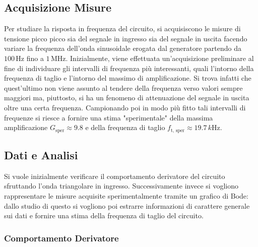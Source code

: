 \documentclass[a4paper,11pt]{article} %
\begin{document}
\subsection{Acquisizione Misure}

Per studiare la risposta in frequenza del circuito, si acquisiscono le misure di tensione picco picco sia del segnale in
ingresso sia del segnale in uscita facendo variare la frequenza dell'onda sinusoidale erogata dal generatore partendo da
$100\,\si{\Hz}$ fino a $1\,\si{\MHz}$. Inizialmente, viene effettuata un'acquisizione preliminare al fine di individuare
gli intervalli di frequenza più interessanti, quali l'intorno della frequenza di taglio e l'intorno del massimo di
amplificazione. Si trova infatti che quest'ultimo non viene assunto al tendere della frequenza verso valori sempre
maggiori ma, piuttosto, si ha un fenomeno di attenuazione del segnale in uscita oltre una certa frequenza. Campionando
poi in modo più fitto tali intervalli di frequenze si riesce a fornire una stima "sperimentale" della massima
amplificazione $G_{\text{sper}}\approx 9.8$ e della frequenza di taglio $f_{\text{t, sper}}\approx 19.7\,\si{k\Hz}$.



\subsection{Dati e Analisi}

Si vuole inizialmente verificare il comportamento derivatore del circuito sfruttando l'onda triangolare in ingresso.
Successivamente invece si vogliono rappresentare le misure acquisite sperimentalmente tramite un grafico di Bode: dallo
studio di questo si vogliono poi estrarre informazioni di carattere generale sui dati e fornire una stima della
frequenza di taglio del circuito.



\subsubsection{Comportamento Derivatore}
\end{document}
